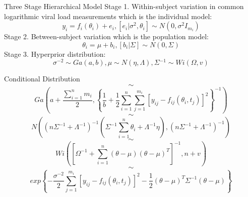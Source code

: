\documentclass[9pt]{beamer}
\begin{document}
\begin{frame}{Three Stage Hierarchical Model}
Stage 1.
Within-subject variation in common logarithmic viral load measurements which is the individual model:
\begin{equation}
y_{i}=f_{i}(\theta{}_{i})+e_{i}, [e_{i}|\sigma{}^{2},\theta{}_{i}]\sim{}N(0,\sigma{}^{2}I_{m_i})
\end{equation}
Stage 2.
Between-subject variation which is the population model:
\begin{equation}
\theta_{i}=\mu+b_{i}, [b_{i}|\Sigma]\sim{}N(0,\Sigma)
\end{equation}
Stage 3.
Hyperprior distribution:
\begin{equation}
\sigma^{-2}\sim{}Ga(a,b), \mu\sim{}N(\eta,\Lambda), \Sigma{}^{-1}\sim{}Wi(\Omega,v)
\end{equation}
\end{frame}


\begin{frame}{Conditional Distribution}
\begin{equation*}
[\sigma{}^{-2}|\mu{},\Sigma{}^{-1},\Theta{},Y] \sim{}
\end{equation*}
\begin{equation}
Ga\left(a+\frac{\sum_{i=1}^{n}m_{i}}{2},\left\{\frac{1}{b}+\frac{1}{2}\sum_{i=1}^{n}\sum_{j=1}^{m_{i}}[y_{ij}-f_{ij}(\theta_{i},t_{j})]^{2}\right\}^{-1}\right)
\end{equation}
\begin{equation*}
[\mu{}|\sigma{}^{-2},\Sigma{}^{-1},\Theta{},Y] \sim{}
\end{equation*}
\begin{equation}
N\left((n\Sigma^{-1}+\Lambda^{-1})^{-1}(\Sigma^{-1}\sum_{i=1}^{n}\theta_{i}+\Lambda^{-1}\eta),(n\Sigma^{-1}+\Lambda^{-1})^{-1}\right)
\end{equation}
\begin{equation*}
[\Sigma{}^{-1}|\sigma{}^{-2},\mu{},\Theta{},Y] \sim{}
\end{equation*}
\begin{equation}
Wi\left(\left[\Omega^{-1}+\sum_{i=1}^{n}(\theta-\mu)(\theta-\mu)^{T}\right]^{-1},n+v\right)
\end{equation}
\begin{equation*}
[\theta_{i}|\sigma{}^{-2},\mu{},\Sigma{}^{-1},\Theta{}_{\{i\}},Y] \sim{}
\end{equation*}
\begin{equation}
exp\left\{-\frac{\sigma^{-2}}{2}\sum_{j=1}^{m_{i}}[y_{ij}-f_{ij}(\theta_{i},t_{j})]^{2}-\frac{1}{2}(\theta-\mu)^{T}\Sigma^{-1}(\theta-\mu)\right\}
\end{equation}
\end{frame}
\end{document}
